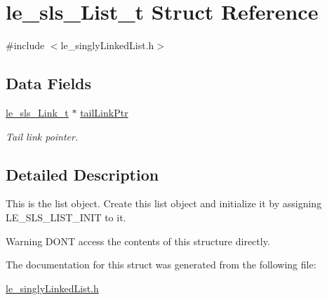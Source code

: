 \hypertarget{structle__sls___list__t}{}\section{le\+\_\+sls\+\_\+\+List\+\_\+t Struct Reference}
\label{structle__sls___list__t}


{\ttfamily \#include $<$le\+\_\+singly\+Linked\+List.\+h$>$}

\subsection*{Data Fields}
\begin{DoxyCompactItemize}
\item 
\hyperlink{structle__sls___link__t}{le\+\_\+sls\+\_\+\+Link\+\_\+t} $\ast$ \hyperlink{structle__sls___list__t_a696f83142673b69689c6dcf750a09e4a}{tail\+Link\+Ptr}\hypertarget{structle__sls___list__t_a696f83142673b69689c6dcf750a09e4a}{}\label{structle__sls___list__t_a696f83142673b69689c6dcf750a09e4a}

\begin{DoxyCompactList}\small\item\em Tail link pointer. \end{DoxyCompactList}\end{DoxyCompactItemize}


\subsection{Detailed Description}
This is the list object. Create this list object and initialize it by assigning L\+E\+\_\+\+S\+L\+S\+\_\+\+L\+I\+S\+T\+\_\+\+I\+N\+IT to it.

\begin{DoxyWarning}{Warning}
D\+ON\textquotesingle{}T access the contents of this structure directly. 
\end{DoxyWarning}


The documentation for this struct was generated from the following file\+:\begin{DoxyCompactItemize}
\item 
\hyperlink{le__singly_linked_list_8h}{le\+\_\+singly\+Linked\+List.\+h}\end{DoxyCompactItemize}
